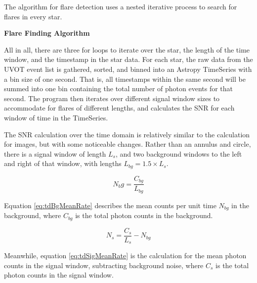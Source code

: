 \documentclass{article}
\begin{document}
\begin{multicols}{2}
The algorithm for flare detection uses a nested iterative process to search for flares in every star. 

\noindent\makebox[\linewidth]{\rule{\columnwidth}{0.4pt}} 
\textbf{Flare Finding Algorithm}

\begin{algorithmic}
        \ENDFOR
    \ENDFOR
\ENDFOR
\end{algorithmic}

\noindent\makebox[\linewidth]{\rule{\columnwidth}{0.4pt}}

All in all, there are three for loops to iterate over the star, the length of the time window, and the timestamp in the star data. For each star, the raw data from the UVOT event list is gathered, sorted, and binned into an Astropy TimeSeries with a bin size of one second. That is, all timestamps within the same second will be summed into one bin containing the total number of photon events for that second. The program then iterates over different signal window sizes to accommodate for flares of different lengths, and calculates the SNR for each window of time in the TimeSeries. 

The SNR calculation over the time domain is relatively similar to the calculation for images, but with some noticeable changes. Rather than an annulus and circle, there is a signal window of length \(L_s\), and two background windows to the left and right of that window, with lengths \(L_{bg} = 1.5 \times L_s\). 

\begin{equation} \label{eq:tdBgMeanRate}
    N_bg = \frac{C_{bg}}{L_{bg}}
\end{equation}

Equation \ref{eq:tdBgMeanRate} describes the mean counts per unit time \(N_{bg}\) in the background, where \(C_{bg}\) is the total photon counts in the background. 

\begin{equation} \label{eq:tdSigMeanRate}
    N_s = \frac{C_s}{L_s} - N_{bg}
\end{equation}

Meanwhile, equation \ref{eq:tdSigMeanRate} is the calculation for the mean photon counts in the signal window, subtracting background noise, where \(C_s\) is the total photon counts in the signal window. 


\end{multicols}
\end{document}

